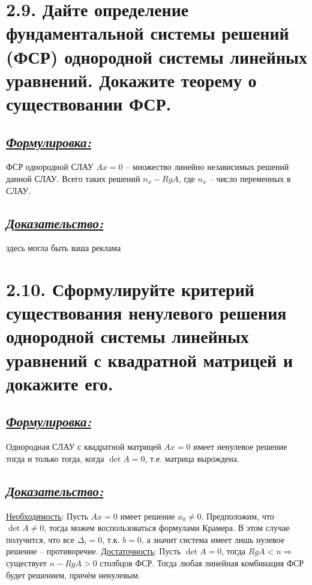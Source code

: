 \documentclass{article}
\begin{document}
\section*{\LARGE 2.9. Дайте определение фундаментальной системы решений (ФСР) однородной системы линейных уравнений. Докажите теорему о существовании ФСР. }
\subsection*{\Large \underline{\textit{Формулировка: }}}
ФСР однородной СЛАУ $Ax = 0$ -- множество линейно независимых решений данной СЛАУ. Всего таких решений $n_x -  RgA$, где $n_x$ -- число переменных в СЛАУ.

\subsection*{\Large \underline{\textit{Доказательство: }}}
здесь могла быть ваша реклама

\section*{\LARGE 2.10. Сформулируйте критерий существования ненулевого решения однородной системы линейных уравнений с квадратной матрицей и докажите его. }
\subsection*{\Large \underline{\textit{Формулировка: }}}
Однородная СЛАУ с квадратной матрицей $Ax = 0$ имеет ненулевое решение тогда и только тогда, когда $\det{A} = 0$, т.е. матрица вырождена.

\subsection*{\Large \underline{\textit{Доказательство: }}}
\underline{Необходимость}:
\newline Пусть $Ax = 0$ имеет решение $x_0 \ne 0$. Предположим, что $\det{A} \ne 0$, тогда можем воспользоваться формулами Крамера. В этом случае получится, что все $\Delta_i = 0$, т.к. $b = 0$, а значит система имеет лишь нулевое решение -- противоречие.
\newline \underline{Достаточность}:
\newline Пусть $\det{A} = 0$, тогда $RgA < n \Rightarrow$ существует $n - RgA > 0$ столбцов ФСР. Тогда любая линейная комбинация ФСР будет решением, причём ненулевым. 
\end{document}
